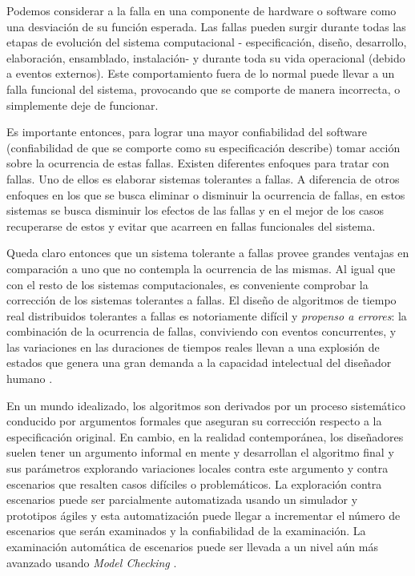 \documentclass[titlepage, 12pt]{book}
\begin{document}
Podemos considerar a la falla en una componente de hardware o software como una desviaci\'on de su funci\'on esperada. Las fallas pueden surgir durante todas las etapas de evoluci\'on del sistema computacional - especificaci\'on, dise\~no, desarrollo, elaboraci\'on, ensamblado, instalaci\'on- y durante toda su vida operacional \cite{faultInjection} (debido a eventos externos). Este comportamiento fuera de lo normal puede llevar a un falla funcional del sistema, provocando que se comporte de manera incorrecta, o simplemente deje de funcionar.

Es importante entonces, para lograr una mayor confiabilidad del software (confiabilidad de que se comporte como su especificaci\'on describe) tomar acci\'on sobre la ocurrencia de estas fallas. Existen diferentes enfoques para tratar con fallas. Uno de ellos es elaborar sistemas tolerantes a fallas. A diferencia de otros enfoques en los que se busca eliminar o disminuir la ocurrencia de fallas, en estos sistemas se busca disminuir los efectos de las fallas y en el mejor de los casos recuperarse de estos y evitar que acarreen en fallas funcionales del sistema.

Queda claro entonces que un sistema tolerante a fallas provee grandes ventajas en comparaci\'on a uno que no contempla la ocurrencia de las mismas. Al igual que con el resto de los sistemas computacionales, es conveniente comprobar la correcci\'on de los sistemas tolerantes a fallas. El dise\~no de algoritmos de tiempo real distribuidos tolerantes a fallas es notoriamente dif\'icil y \emph{propenso a errores}: la combinaci\'on de la ocurrencia de fallas, conviviendo con eventos concurrentes, y las variaciones en las duraciones de tiempos reales llevan a una explosi\'on de estados que genera una gran demanda a la capacidad intelectual del dise\~nador humano \cite{SteinerRushby}.

En un mundo idealizado, los algoritmos son derivados por un proceso sistem\'atico conducido por argumentos formales que aseguran su correcci\'on respecto a la especificaci\'on original. En cambio, en la realidad contempor\'anea, los dise\~nadores suelen tener un argumento informal en mente y desarrollan el algoritmo final y sus par\'ametros explorando variaciones locales contra este argumento y contra escenarios que resalten casos dif\'iciles o problem\'aticos. La exploraci\'on contra escenarios puede ser parcialmente automatizada usando un simulador y prototipos \'agiles y esta automatizaci\'on puede llegar a incrementar el n\'umero de escenarios que ser\'an examinados y la confiabilidad de la examinaci\'on. La examinaci\'on autom\'atica de escenarios puede ser llevada a un nivel a\'un m\'as avanzado usando \emph{Model Checking} \cite{SteinerRushby}.
\end{document}

